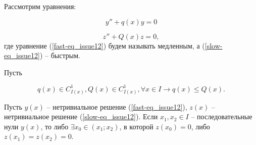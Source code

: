 \begin{theorem}

Рассмотрим уравнения:

\begin{equation}\label{fast-eq_issue12}
y'' + q(x) y = 0
\end{equation}

\begin{equation}\label{slow-eq_issue12}
z'' + Q(x)z = 0,
\end{equation}
где уравнение (\ref{fast-eq_issue12}) будем называть медленным, а (\ref{slow-eq_issue12}) -- быстрым.

Пусть 

\[q(x)\in C^1_{I(x)}, Q(x) \in C^1_{I(x)}, \forall x \in I \rightarrow q(x) \leqslant Q(x).\]

Пусть $y(x)$ -- нетривиальное решение (\ref{fast-eq_issue12}), $z(x)$ -- нетривиальное решение (\ref{slow-eq_issue12}). Если $x_1, x_2 \in I$ -- последовательные нули $y(x)$, то либо $\exists x_0 \in (x_1;x_2)$, в которой $z(x_0) = 0$, либо $z(x_1) = z(x_2) = 0$.
\end{theorem}

